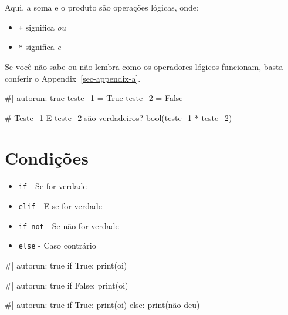 \documentclass[
  letterpaper,
  DIV=11,
  numbers=noendperiod]{scrreprt}
\newenvironment{Shaded}{\begin{snugshade}}{\end{snugshade}}
\newcommand{\NormalTok}[1]{\textcolor[rgb]{0.00,0.23,0.31}{#1}}
\providecommand{\tightlist}{%
  \setlength{\itemsep}{0pt}\setlength{\parskip}{0pt}}
\begin{document}
Aqui, a soma e o produto são operações lógicas, onde:

\begin{itemize}
\tightlist
\item
  \texttt{+} significa \emph{ou}
\item
  \texttt{*} significa \emph{e}
\end{itemize}

Se você não sabe ou não lembra como os operadores lógicos funcionam,
basta conferir o Appendix~\ref{sec-appendix-a}.

\begin{Shaded}
\begin{Highlighting}[]
\NormalTok{\#| autorun: true}
\NormalTok{teste\_1 = True}
\NormalTok{teste\_2 = False}

\NormalTok{\# Teste\_1 E teste\_2 são verdadeiros?}
\NormalTok{bool(teste\_1 * teste\_2)}
\end{Highlighting}
\end{Shaded}

\section{Condições}\label{condiuxe7uxf5es}

\begin{itemize}
\tightlist
\item
  \texttt{if} - Se for verdade
\item
  \texttt{elif} - E se for verdade
\item
  \texttt{if\ not} - Se não for verdade
\item
  \texttt{else} - Caso contrário
\end{itemize}

\begin{Shaded}
\begin{Highlighting}[]
\NormalTok{\#| autorun: true}
\NormalTok{if True:}
\NormalTok{    print(\textquotesingle{}oi\textquotesingle{})}
\end{Highlighting}
\end{Shaded}

\begin{Shaded}
\begin{Highlighting}[]
\NormalTok{\#| autorun: true}
\NormalTok{if False:}
\NormalTok{    print(\textquotesingle{}oi\textquotesingle{})}
\end{Highlighting}
\end{Shaded}

\begin{Shaded}
\begin{Highlighting}[]
\NormalTok{\#| autorun: true}
\NormalTok{if True:}
\NormalTok{    print(\textquotesingle{}oi\textquotesingle{})}
\NormalTok{else:}
\NormalTok{    print(\textquotesingle{}não deu\textquotesingle{})}
\end{Highlighting}
\end{Shaded}
\end{document}
